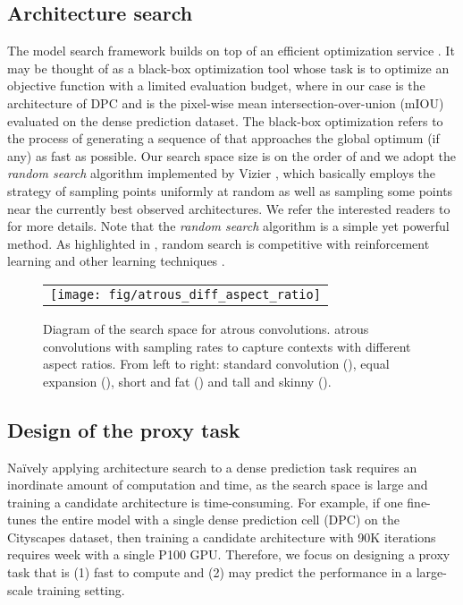 \documentclass{article}
\begin{document}
\subsection{Architecture search}

The model search framework builds on top of an efficient optimization service \cite{golovin2017google}. It may be thought of as a black-box optimization tool whose task is to optimize an objective function  with a limited evaluation budget, where in our case  is the architecture of DPC and  is the pixel-wise mean intersection-over-union (mIOU) \cite{everingham2014pascal} evaluated on the dense prediction dataset. The black-box optimization refers to the process of generating a sequence of  that approaches the global optimum (if any) as fast as possible. Our search space size is on the order of  and we adopt the \textit{random search} algorithm implemented by Vizier \cite{golovin2017google}, which basically employs the strategy of sampling points  uniformly at random as well as sampling some points  near the currently best observed architectures. We refer the interested readers to \cite{golovin2017google} for more details. Note that the \textit{random search} algorithm is a simple yet powerful method. As highlighted in \cite{zoph2017learning}, random search is competitive with reinforcement learning and other learning techniques \cite{liu2018progressive}.

\begin{figure}[!t]
  \centering
  \begin{tabular}{c}
    \texttt{[image: fig/atrous\_diff\_aspect\_ratio]} \\
  \end{tabular}
  \caption{Diagram of the search space for atrous convolutions.  atrous convolutions with sampling rates  to capture contexts with different aspect ratios. From left to right: standard convolution (), equal expansion (), short and fat () and tall and skinny ().}
  \label{fig:atrous_diff_aspect_ratio}
\end{figure}

\subsection{Design of the proxy task}
Na\"{i}vely applying architecture search to a dense prediction task requires an inordinate amount of computation and time, as the search space is large and training a candidate architecture is time-consuming. For example, if one fine-tunes the entire model with a single dense prediction cell (DPC) on the Cityscapes dataset, then training a candidate architecture with 90K iterations requires  week with a single P100 GPU. Therefore, we focus on designing a proxy task that is (1) fast to compute and (2) may predict the performance in a large-scale training setting.
\end{document}
